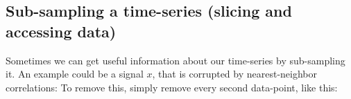 \subsection{Sub-sampling a time-series (slicing and accessing data)}
Sometimes we can get useful information about our time-series by sub-sampling it.
An example could be a signal $x$, that is corrupted by nearest-neighbor correlations: To remove this, simply remove every second data-point, like this: